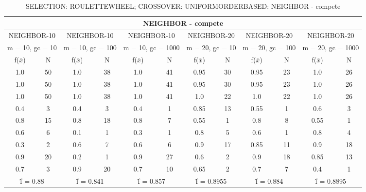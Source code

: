 \begin{table}[H]
	\centering
	\caption{SELECTION: ROULETTEWHEEL; CROSSOVER: UNIFORMORDERBASED: NEIGHBOR - compete}
	\begin{adjustbox}{width=1\textwidth}
		\begin{tabular}{ |c|c||c|c||c|c||c|c||c|c||c|c| }
			\hline
			\multicolumn{12}{|c|}{NEIGHBOR - compete} \\
			\hline
			\multicolumn{2}{|c||}{NEIGHBOR-10} & \multicolumn{2}{c||}{NEIGHBOR-10} & \multicolumn{2}{c||}{NEIGHBOR-10} & \multicolumn{2}{c||}{NEIGHBOR-20} & \multicolumn{2}{c||}{NEIGHBOR-20} & \multicolumn{2}{c|}{NEIGHBOR-20}\\
			\hline
			\multicolumn{2}{|c||}{m = 10, gc = 10} & \multicolumn{2}{c||}{m = 10, gc = 100} & \multicolumn{2}{c||}{m = 10, gc = 1000} & \multicolumn{2}{c||}{m = 20, gc = 10} & \multicolumn{2}{c||}{m = 20, gc = 100} & \multicolumn{2}{c|}{m = 20, gc = 1000}\\
			\hline
			f($\bar{x}$) & N & f($\bar{x}$) & N & f($\bar{x}$) & N & f($\bar{x}$) & N & f($\bar{x}$) & N & f($\bar{x}$) & N\\
			\hline
			\hline
			1.0 & 50 & 1.0 & 38 & 1.0 & 41 & 0.95 & 30 & 0.95 & 23 & 1.0 & 26\\
			\hline
			1.0 & 50 & 1.0 & 38 & 1.0 & 41 & 0.95 & 30 & 0.95 & 23 & 1.0 & 26\\
			1.0 & 50 & 1.0 & 38 & 1.0 & 41 & 1.0 & 22 & 1.0 & 22 & 1.0 & 26\\
			0.4 & 3 & 0.4 & 3 & 0.4 & 1 & 0.85 & 13 & 0.55 & 1 & 0.6 & 3\\
			0.8 & 15 & 0.8 & 18 & 0.8 & 7 & 0.55 & 1 & 0.8 & 8 & 0.55 & 1\\
			0.6 & 6 & 0.1 & 1 & 0.3 & 1 & 0.8 & 5 & 0.6 & 1 & 0.8 & 4\\
			0.3 & 2 & 0.6 & 7 & 0.6 & 6 & 0.9 & 17 & 0.85 & 11 & 0.9 & 18\\
			0.9 & 20 & 0.2 & 1 & 0.9 & 27 & 0.6 & 2 & 0.9 & 18 & 0.85 & 13\\
			0.7 & 3 & 0.9 & 20 & 0.7 & 10 & 0.65 & 2 & 0.7 & 7 & 0.4 & 1\\
			\hline
			\multicolumn{2}{|c||}{\^{f} = 0.88} & \multicolumn{2}{c||}{\^{f} = 0.841} & \multicolumn{2}{c||}{\^{f} = 0.857} & \multicolumn{2}{c||}{\^{f} = 0.8955} & \multicolumn{2}{c||}{\^{f} = 0.884} & \multicolumn{2}{c|}{\^{f} = 0.8895}\\
			\hline
		\end{tabular}
	\end{adjustbox}
\end{table}

